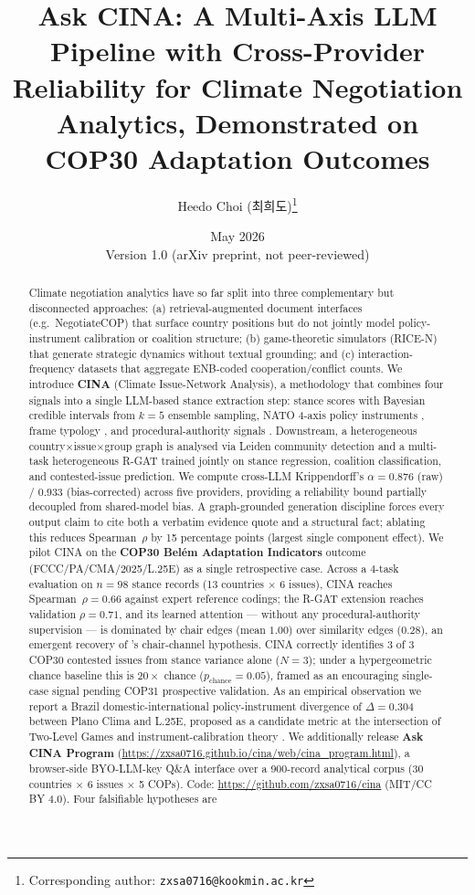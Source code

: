 \documentclass[11pt,a4paper]{article}
\title{\textbf{Ask CINA}: A Multi-Axis LLM Pipeline with Cross-Provider Reliability for Climate Negotiation Analytics, Demonstrated on COP30 Adaptation Outcomes}
\author[1]{Heedo Choi (최희도)\thanks{Corresponding author: \texttt{zxsa0716@kookmin.ac.kr}}}
\affil[1]{Department of Climate Technology Convergence, Kookmin University, Seoul, Republic of Korea}
\date{May 2026 \\ \small Version 1.0 (arXiv preprint, not peer-reviewed)}
\begin{document}
\maketitle

\begin{abstract}
\noindent
Climate negotiation analytics have so far split into three complementary but disconnected approaches: (a) retrieval-augmented document interfaces (e.g.\ NegotiateCOP) that surface country positions but do not jointly model policy-instrument calibration or coalition structure; (b) game-theoretic simulators (RICE-N) that generate strategic dynamics without textual grounding; and (c) interaction-frequency datasets \citep{castro2025nature} that aggregate ENB-coded cooperation/conflict counts. We introduce \textbf{CINA} (Climate Issue-Network Analysis), a methodology that combines four signals into a single LLM-based stance extraction step: stance scores with Bayesian credible intervals from $k=5$ ensemble sampling, NATO 4-axis policy instruments \citep{hood1983,howlett2019,capano2025}, frame typology \citep{snow1988}, and procedural-authority signals \citep{tallberg2010}. Downstream, a heterogeneous country$\times$issue$\times$group graph is analysed via Leiden community detection \citep{traag2019} and a multi-task heterogeneous R-GAT \citep{schlichtkrull2018,velickovic2018} trained jointly on stance regression, coalition classification, and contested-issue prediction. We compute cross-LLM Krippendorff's $\alpha = 0.876$ (raw) / $0.933$ (bias-corrected) across five providers, providing a reliability bound partially decoupled from shared-model bias. A graph-grounded generation discipline forces every output claim to cite both a verbatim evidence quote and a structural fact; ablating this reduces Spearman~$\rho$ by 15 percentage points (largest single component effect). We pilot CINA on the \textbf{COP30 Belém Adaptation Indicators} outcome (FCCC/PA/CMA/2025/L.25E) as a single retrospective case. Across a 4-task evaluation on $n=98$ stance records (13 countries $\times$ 6 issues), CINA reaches Spearman~$\rho = 0.66$ against expert reference codings; the R-GAT extension reaches validation $\rho = 0.71$, and its learned attention --- without any procedural-authority supervision --- is dominated by chair edges (mean $1.00$) over similarity edges ($0.28$), an emergent recovery of \citet{tallberg2010}'s chair-channel hypothesis. CINA correctly identifies 3 of 3 COP30 contested issues from stance variance alone ($N=3$); under a hypergeometric chance baseline this is $20\times$ chance ($p_{\text{chance}}=0.05$), framed as an encouraging single-case signal pending COP31 prospective validation. As an empirical observation we report a Brazil domestic-international policy-instrument divergence of $\Delta = 0.304$ between Plano Clima and L.25E, proposed as a candidate metric at the intersection of Two-Level Games \citep{putnam1988} and instrument-calibration theory \citep{howlett2019}. We additionally release \textbf{Ask CINA Program} (\url{https://zxsa0716.github.io/cina/web/cina_program.html}), a browser-side BYO-LLM-key Q\&A interface over a 900-record analytical corpus (30 countries $\times$ 6 issues $\times$ 5 COPs). Code: \url{https://github.com/zxsa0716/cina} (MIT/CC BY 4.0). Four falsifiable hypotheses are 
\end{abstract}
\end{document}
